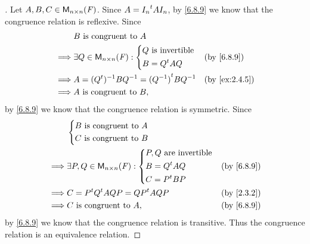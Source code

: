 \begin{proof}[]
  Let \(A, B, C \in \ms[n][n][\F]\).
  Since \(A = {I_n}^{t} A I_n\), by \cref{6.8.9} we know that the congruence relation is reflexive.
  Since
  \begin{align*}
             & B \text{ is congruent to } A                                           \\
    \implies & \exists Q \in \ms[n][n][\F] : \begin{dcases}
                                               Q \text{ is invertible} \\
                                               B = \tp{Q} A Q
                                             \end{dcases}        &  & \by{6.8.9}      \\
    \implies & A = (\tp{Q})^{-1} B Q^{-1} = \tp{(Q^{-1})} B Q^{-1} &  & \by{ex:2.4.5} \\
    \implies & A \text{ is congruent to } B,
  \end{align*}
  by \cref{6.8.9} we know that the congruence relation is symmetric.
  Since
  \begin{align*}
             & \begin{dcases}
                 B \text{ is congruent to } A \\
                 C \text{ is congruent to } B
               \end{dcases}                                    \\
    \implies & \exists P, Q \in \ms[n][n][\F] : \begin{dcases}
                                                  P, Q \text{ are invertible} \\
                                                  B = \tp{Q} A Q              \\
                                                  C = \tp{P} B P
                                                \end{dcases} &  & \by{6.8.9}   \\
    \implies & C = \tp{P} \tp{Q} A Q P = \tp{QP} A QP          &  & \by{2.3.2} \\
    \implies & C \text{ is congruent to } A,                   &  & \by{6.8.9}
  \end{align*}
  by \cref{6.8.9} we know that the congruence relation is transitive.
  Thus the congruence relation is an equivalence relation.
\end{proof}

\begin{ex}\label{ex:6.8.13}
\end{ex}
